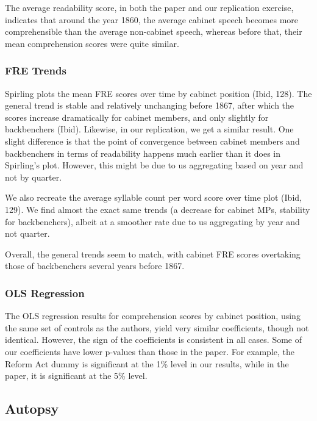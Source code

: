 \documentclass[
  letterpaper,
  DIV=11,
  numbers=noendperiod]{scrartcl}
\begin{document}
The average readability score, in both the paper and our replication
exercise, indicates that around the year 1860, the average cabinet
speech becomes more comprehensible than the average non-cabinet speech,
whereas before that, their mean comprehension scores were quite similar.

\subsubsection{FRE Trends}\label{fre-trends}

Spirling plots the mean FRE scores over time by cabinet position (Ibid,
128). The general trend is stable and relatively unchanging before 1867,
after which the scores increase dramatically for cabinet members, and
only slightly for backbenchers (Ibid). Likewise, in our replication, we
get a similar result. One slight difference is that the point of
convergence between cabinet members and backbenchers in terms of
readability happens much earlier than it does in Spirling's plot.
However, this might be due to us aggregating based on year and not by
quarter.~

We also recreate the average syllable count per word score over time
plot (Ibid, 129). We find almost the exact same trends (a decrease for
cabinet MPs, stability for backbenchers), albeit at a smoother rate due
to us aggregating by year and not quarter.~

Overall, the general trends seem to match, with cabinet FRE scores
overtaking those of backbenchers several years before 1867.

\subsubsection{OLS Regression}\label{ols-regression}

The OLS regression results for comprehension scores by cabinet position,
using the same set of controls as the authors, yield very similar
coefficients, though not identical. However, the sign of the
coefficients is consistent in all cases. Some of our coefficients have
lower p-values than those in the paper. For example, the Reform Act
dummy is significant at the 1\% level in our results, while in the
paper, it is significant at the 5\% level.

\subsection{Autopsy}\label{autopsy}
\end{document}
